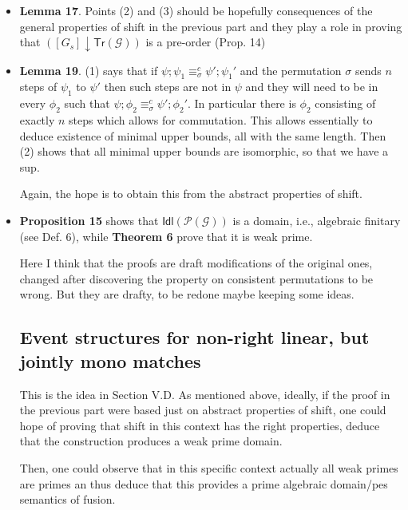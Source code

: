 \documentclass{llncs}
\newcommand{\ideal}[1]{\ensuremath{\mathsf{Idl}({#1})}}
\newcommand{\slice}[2]{\ensuremath{({#1} \downarrow {#2})}}
\newcommand{\poset}[1]{\ensuremath{\mathcal{P}({#1})}}
\newcommand{\tr}[1]{\ensuremath{\mathsf{Tr}({#1})}}
\begin{document}
\begin{itemize}

\item
  \textbf{Lemma 17}. Points (2) and (3) should be hopefully consequences of the general properties of shift in the previous part and they play a role in proving that $\slice{[G_s]}{\tr{\mathcal{G}}}$ is a pre-order (Prop. 14)

\item
  \textbf{Lemma 19}.
  (1) says that if $\psi; \psi_1 \equiv^c_\sigma \psi'; \psi_1'$ and the permutation $\sigma$ sends $n$ steps of $\psi_1$ to $\psi'$ then such steps are not in $\psi$ and they will need to be in every $\phi_2$ such that $\psi; \phi_2 \equiv^c_\sigma \psi'; \phi_2'$. In particular there is $\phi_2$ consisting of exactly $n$ steps which allows for commutation. This allows essentially to deduce existence of minimal upper bounds, all with the same length. 
  Then (2) shows that all minimal upper bounds are isomorphic, so that we have a sup.

  Again, the hope is to obtain this from the abstract properties of
  shift.
  
\item \textbf{Proposition 15} shows that $\ideal{\poset{\mathcal{G}}}$
  is a domain, i.e., algebraic finitary (see Def. 6), while
  \textbf{Theorem 6} prove that it is weak prime.

  Here I think that the proofs are draft modifications of the original ones, changed after discovering the property on consistent permutations to be wrong. But they are drafty, to be redone maybe keeping some ideas.


\subsection*{Event structures for non-right linear, but jointly mono matches}

This is the idea in Section V.D. As mentioned above, ideally, if the proof in the previous part were based just on abstract properties of shift, one could hope of proving that shift in this context has the right properties, deduce that the construction produces a weak prime domain.

Then, one could observe that in this specific context actually all weak primes are primes an thus deduce that this provides a prime algebraic domain/pes semantics of fusion.
  
\end{itemize}
\end{document}
